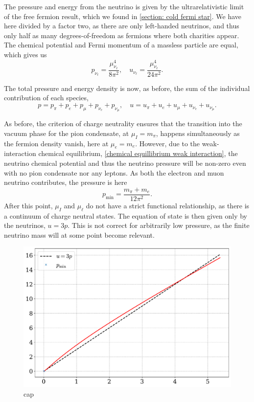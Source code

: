 The pressure and energy from the neutrino is given by the ultrarelativistic limit of the free fermion result, which we found in \autoref{section: cold fermi star}.
We have here divided by a factor two, as there are only left-handed neutrinos, and thus only half as many degrees-of-freedom as fermions where both charities appear.
The chemical potential and Fermi momentum of a massless particle are equal, which gives us
%
\begin{equation}
    p_{\nu_\ell} = \frac{\mu_{\nu_\ell}^4}{8 \pi^2}, \quad 
    u_{\nu_\ell} = \frac{\mu_{\nu_\ell}^4}{24 \pi^2}.
\end{equation}
%

The total pressure and energy density is now, as before, the sum of the individual contribution of each species,
%
\begin{equation}
    p = p_\pi + p_e + p_\mu + p_{\nu_e} + p_{\nu_\mu}, \quad
    u = u_\pi + u_e + u_\mu + u_{\nu_e} + u_{\nu_\mu}.
\end{equation}

As before, the criterion of charge neutrality ensures that the transition into the vacuum phase for the pion condensate, at $\mu_I = m_\pi$, happens simultaneously as the fermion density vanish, here at $\mu_e = m_e$.
However, due to the weak-interaction chemical equilibrium, \autoref{chemical equillibrium weak interaction}, the neutrino chemical potential and thus the neutrino pressure will be non-zero even with no pion condensate nor any leptons. 
As both the electron and muon neutrino contributes, the pressure is here
%
\begin{equation}
    p_\text{min} = \frac{m_\pi+m_e}{12 \pi^2}.
\end{equation}
%
After this point, $\mu_I$ and $\mu_\ell$ do not have a strict functional relationship, as there is a continuum of charge neutral states.
The equation of state is then given only by the neutrinos, $u = 3p$.
This is not correct for arbitrarily low pressure, as the finite neutrino mass will at some point become relevant.

\begin{figure}[!htb]
    \centering
    \includegraphics[width=\textwidth]{../scripts/figurer/neutrino_eos.pdf}
    \caption{
        cap
    }
    \label{fig: neutrino eos}
\end{figure}



